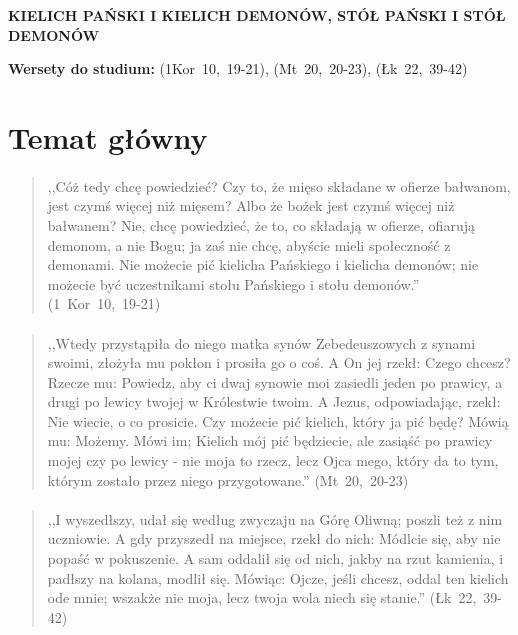 \documentclass[10pt,a4paper,oneside]{article}
\begin{document}
\centerline{\textbf{\MakeUppercase{Kielich Pański i kielich demonów, stół Pański i stół demonów}}}
\begin{center}
\textbf{Wersety do studium:} \mbox{(1Kor 10, 19-21)}, \mbox{(Mt 20, 20-23)}, \mbox{(Łk 22, 39-42)}
\end{center}
\section{Temat główny}
\paragraph{}
\begin{quote}
,,Cóż tedy chcę powiedzieć? Czy to, że mięso składane w ofierze bałwanom, jest czymś więcej niż mięsem? Albo że bożek jest czymś więcej niż bałwanem? Nie, chcę powiedzieć, że to, co składają w ofierze, ofiarują demonom, a nie Bogu; ja zaś nie chcę, abyście mieli społeczność z demonami. Nie możecie pić kielicha Pańskiego i kielicha demonów; nie możecie być uczestnikami stołu Pańskiego i stołu demonów.'' \mbox{(1 Kor 10, 19-21)}
\end{quote}
\paragraph{}
\begin{quote}
,,Wtedy przystąpiła do niego matka synów Zebedeuszowych z synami swoimi, złożyła mu pokłon i prosiła go o coś. A On jej rzekł: Czego chcesz? Rzecze mu: Powiedz, aby ci dwaj synowie moi zasiedli jeden po prawicy, a drugi po lewicy twojej w Królestwie twoim. A Jezus, odpowiadając, rzekł: Nie wiecie, o co prosicie. Czy możecie pić kielich, który ja pić będę? Mówią mu: Możemy. Mówi im; Kielich mój pić będziecie, ale zasiąść po prawicy mojej czy po lewicy - nie moja to rzecz, lecz Ojca mego, który da to tym, którym zostało przez niego przygotowane.'' \mbox{(Mt 20, 20-23)}
\end{quote}
\paragraph{}
\begin{quote}
,,I wyszedłszy, udał się według zwyczaju na Górę Oliwną; poszli też z nim uczniowie. A gdy przyszedł na miejsce, rzekł do nich: Módlcie się, aby nie popaść w pokuszenie. A sam oddalił się od nich, jakby na rzut kamienia, i padłszy na kolana, modlił się. Mówiąc: Ojcze, jeśli chcesz, oddal ten kielich ode mnie; wszakże nie moja, lecz twoja wola niech się stanie.'' \mbox{(Łk 22, 39-42)}
\end{quote}
\end{document}
